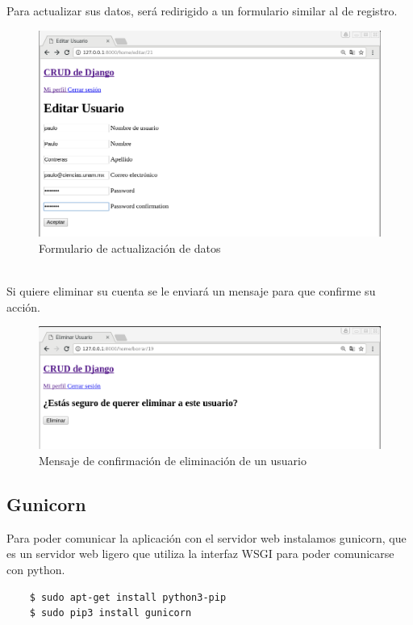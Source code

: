 \documentclass[9pt]{article}
\begin{document}
Para actualizar sus datos, será redirigido a un formulario similar al de registro.\\
\begin{figure}[ht!]
  \centering
  \includegraphics[width=\textwidth]{django_crud/update}
  \caption{Formulario de actualización de datos}
\end{figure}
\\

Si quiere eliminar su cuenta se le enviará un mensaje para que confirme su acción. \\
\begin{figure}[ht!]
  \centering
  \includegraphics[width=\textwidth]{django_crud/delete}
  \caption{Mensaje de confirmación de eliminación de un usuario}
\end{figure}

\subsection{Gunicorn}

Para poder comunicar la aplicación con el servidor web instalamos \textsf{gunicorn}, que es un servidor web ligero que utiliza la interfaz WSGI para poder comunicarse con \textsf{python}.
\begin{verbatim}
    $ sudo apt-get install python3-pip
    $ sudo pip3 install gunicorn
\end{verbatim}
\end{document}
